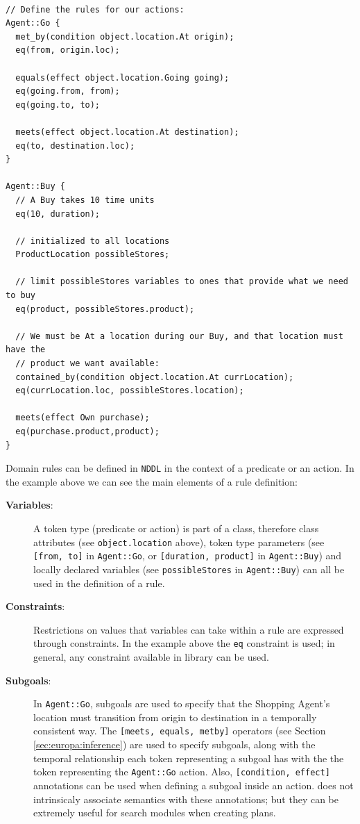 \begin{verbatim}

// Define the rules for our actions:
Agent::Go {
  met_by(condition object.location.At origin);
  eq(from, origin.loc);
 
  equals(effect object.location.Going going);
  eq(going.from, from);
  eq(going.to, to);
   
  meets(effect object.location.At destination);
  eq(to, destination.loc);
}

Agent::Buy {
  // A Buy takes 10 time units
  eq(10, duration);

  // initialized to all locations
  ProductLocation possibleStores;

  // limit possibleStores variables to ones that provide what we need to buy
  eq(product, possibleStores.product);

  // We must be At a location during our Buy, and that location must have the
  // product we want available:
  contained_by(condition object.location.At currLocation);
  eq(currLocation.loc, possibleStores.location);
  
  meets(effect Own purchase);
  eq(purchase.product,product);
}
\end{verbatim}

Domain rules can be defined in \texttt{NDDL} in the context of a
predicate or an action. In the example above we can see the main
elements of a rule definition:

\begin{description}

\item[\textbf{Variables}:] A token type (predicate or action) is part
  of a class, therefore class attributes (see \texttt{object.location}
  above), token type parameters (see \texttt{[from, to]} in
  \texttt{Agent::Go}, or \texttt{[duration, product]} in
  \texttt{Agent::Buy}) and locally declared variables (see
  \texttt{possibleStores} in \texttt{Agent::Buy}) can all be used in
  the definition of a rule.

\item[\textbf{Constraints}:] Restrictions on values that variables can
  take within a rule are expressed through constraints. In the example
  above the \texttt{eq} constraint is used; in general, any constraint
  available in \eus library can be used.

\item[\textbf{Subgoals}:] In \texttt{Agent::Go}, subgoals are used to
  specify that the Shopping Agent's location must transition from
  origin to destination in a temporally consistent way. The
  \texttt{[meets, equals, metby]} operators (see Section
  \ref{sec:europa:inference}) are used to specify subgoals, along with
  the temporal relationship each token representing a subgoal has with
  the the token representing the \texttt{Agent::Go} action. Also,
  \texttt{[condition, effect]} annotations can be used when defining a
  subgoal inside an action. \eu does not intrinsicaly associate semantics
  with these annotations; but they can be extremely useful for search
  modules when creating plans.

\end{description}

